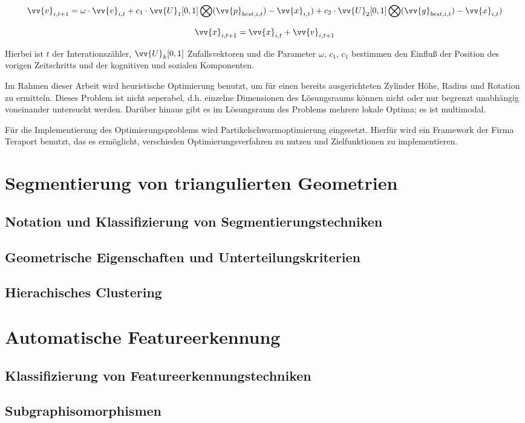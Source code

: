 \begin{equation}
\vv{v}_{i,t+1} = \omega\cdot\vv{v}_{i,t}+c_{1}\cdot\vv{U}_{1}[0,1]\bigotimes(\vv{p}_{best,i,t})-\vv{x}_{i,t})
+c_{2}\cdot\vv{U}_{2}[0,1]\bigotimes(\vv{g}_{best,i,t})-\vv{x}_{i,t})
\end{equation}

\begin{equation}
\vv{x}_{i,t+1} = \vv{x}_{i,t} + \vv{v}_{i,t+1}
\end{equation}

Hierbei ist $t$ der Interationsz\"ahler, $\vv{U}_{k}[0,1]$ Zufallsvektoren und die Parameter $\omega$, $c_{1}$, $c_{1}$ bestimmen den Einflu{\ss}  der Position des vorigen Zeitschritts und der kognitiven und sozialen Komponenten.

Im Rahmen dieser Arbeit wird heuristische Optimierung benutzt, um f\"ur einen bereits ausgerichteten Zylinder H\"ohe, Radius und Rotation zu ermitteln. Dieses Problem ist nicht seperabel, d.h. einzelne Dimensionen des L\"osungsraums k\"onnen nicht oder nur begrenzt unabh\"angig voneinander untersucht werden. Dar\"uber hinaus gibt es im L\"osungsraum des Problems mehrere lokale Optima; es ist multimodal.

F\"ur die Implementierung des Optimierungsproblems wird Partikelschwarmoptimierung eingesetzt. Hierf\"ur wird ein Framework der Firma Teraport benutzt, das es erm\"oglicht, verschieden Optimierungsverfahren zu nutzen und Zielfunktionen zu implementieren.

\section{Segmentierung von triangulierten Geometrien}
\subsection{Notation und Klassifizierung von Segmentierungstechniken}
\subsection{Geometrische Eigenschaften und Unterteilungskriterien}
\subsection{Hierachisches Clustering}

\section{Automatische Featureerkennung}
\subsection{Klassifizierung von Featureerkennungstechniken}
\subsection{Subgraphisomorphismen}




